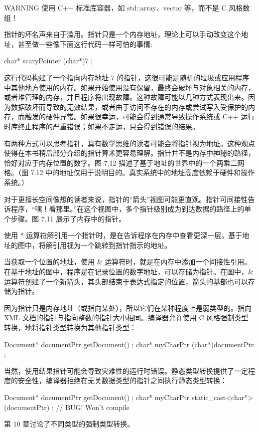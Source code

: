 \begin{myWarning}{WARNING}
使用 C++ 标准库容器，如 std::array、vector 等，而不是 C 风格数组！
\end{myWarning}


指针的坏名声来自于滥用。指针只是一个内存地址，理论上可以手动改变这个地址，甚至做一些像下面这行代码一样可怕的事情:

\begin{cpp}
char* scaryPointer { (char*)7 };
\end{cpp}

这行代码构建了一个指向内存地址 7 的指针，这很可能是随机的垃圾或应用程序中其他地方使用的内存。如果开始使用没有保留，最终会破坏与对象相关的内存，或者堆管理的内存，并且程序将出现故障。这种故障可能以几种方式表现出来。因为数据破坏而导致的无效结果，或者由于访问不存在的内存或尝试写入受保护的内存，而触发的硬件异常。如果很幸运，可能会得到通常导致操作系统或 C++ 运行时库终止程序的严重错误；如果不走运，只会得到错误的结果。


有两种方式可以思考指针，具有数学思维的读者可能会将指针视为地址。这种观点使得在本书稍后部分介绍的指针算术更容易理解。指针并不是内存中神秘的路径，恰好对应于内存位置的数字。图 7.12 描述了基于地址的世界中的一个两乘二网格。（图 7.12 中的地址仅用于说明目的。真实系统中的地址高度依赖于硬件和操作系统。）


对于更擅长空间像想的读者来说，指针的“箭头”视图可能更直观。指针可间接性告诉程序，“嘿！看那里。”在这个视图中，多个指针级别成为到达数据的路径上的单个步骤。图 7.11 展示了内存中的指针。

使用 * 运算符解引用一个指针时，是在告诉程序在内存中查看更深一层。基于地址的图中，将解引用视为一个跳转到指针指示的地址。

当获取一个位置的地址，使用 \& 运算符时，就是在内存中添加一个间接性引用。在基于地址的图中，程序是在记录位置的数字地址，可以存储为指针。在图中，\& 运算符创建了一个新箭头，其头部结束于表达式指定的位置，箭头的基部也可以存储为指针。


因为指针只是内存地址（或指向某处），所以它们在某种程度上是弱类型的。指向 XML 文档的指针与指向整数的指针大小相同。编译器允许使用 C 风格强制类型转换，地将指针类型转换为其他指针类型：

\begin{cpp}
Document* documentPtr { getDocument() };
char* myCharPtr { (char*)documentPtr };
\end{cpp}

当然，使用结果指针可能会导致灾难性的运行时错误。静态类型转换提供了一定程度的安全性，编译器拒绝在无关数据类型的指针之间执行静态类型转换：

\begin{cpp}
Document* documentPtr { getDocument() };
char* myCharPtr { static_cast<char*>(documentPtr) }; // BUG! Won't compile
\end{cpp}

第 10 章讨论了不同类型的强制类型转换。














